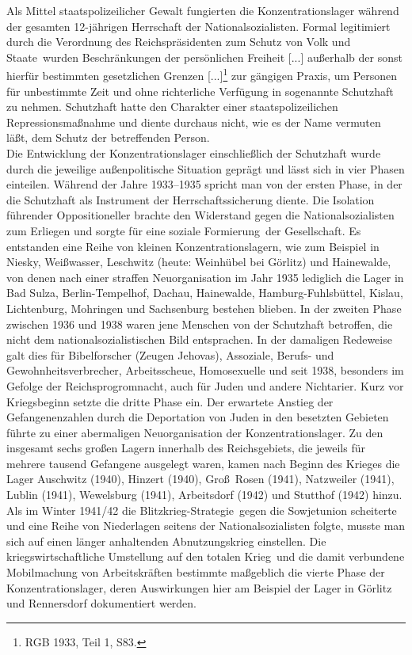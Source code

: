 Als Mittel staatspolizeilicher Gewalt fungierten die Konzentrationslager während der gesamten 12-jährigen Herrschaft der Nationalsozialisten. Formal legitimiert durch die \glqq Verordnung des Reichspräsidenten zum Schutz von Volk und Staate\grqq~wurden \glqq Beschränkungen der persönlichen Freiheit [...] außerhalb der sonst hierfür bestimmten gesetzlichen Grenzen [...]\grqq\footnote{RGB 1933, Teil 1, S83.} zur gängigen Praxis, um Personen für unbestimmte Zeit und ohne richterliche Verfügung in sogenannte Schutzhaft zu nehmen. Schutzhaft hatte den Charakter einer staatspolizeilichen Repressionsmaßnahme und diente durchaus nicht, wie es der Name vermuten läßt, dem Schutz der betreffenden Person.
\\
Die Entwicklung der Konzentrationslager einschließlich der Schutzhaft wurde durch die jeweilige außenpolitische Situation geprägt und lässt sich in vier Phasen einteilen. Während der Jahre 1933--1935 spricht man von der ersten Phase, in der die Schutzhaft als Instrument der Herrschaftssicherung diente. Die Isolation führender Oppositioneller brachte den Widerstand gegen die Nationalsozialisten zum Erliegen und sorgte für eine \glqq soziale Formierung\grqq~der Gesellschaft. Es entstanden eine Reihe von kleinen Konzentrationslagern, wie zum Beispiel in Niesky, Weißwasser, Leschwitz (heute: Weinhübel bei Görlitz) und Hainewalde, von denen nach einer straffen Neuorganisation im Jahr 1935 lediglich die Lager in Bad Sulza, Berlin-Tempelhof, Dachau, Hainewalde, Hamburg-Fuhlsbüttel, Kislau, Lichtenburg, Mohringen und Sachsenburg bestehen blieben.
In der zweiten Phase zwischen 1936 und 1938 waren jene Menschen von der Schutzhaft betroffen, die nicht dem nationalsozialistischen Bild entsprachen. In der damaligen Redeweise galt dies für Bibelforscher (Zeugen Jehovas), Assoziale, Berufs- und Gewohnheitsverbrecher, Arbeitsscheue, Homosexuelle und seit 1938, besonders im Gefolge der Reichsprogromnacht, auch für Juden und andere \glqq Nichtarier\grqq.
Kurz vor Kriegsbeginn setzte die dritte Phase ein. Der erwartete Anstieg der Gefangenenzahlen durch die Deportation von Juden in den besetzten Gebieten führte zu einer abermaligen Neuorganisation der Konzentrationslager. Zu den insgesamt sechs großen Lagern innerhalb des Reichsgebiets, die jeweils für mehrere tausend Gefangene ausgelegt waren, kamen nach Beginn des Krieges die Lager Auschwitz (1940), Hinzert (1940), Groß~Rosen (1941), Natzweiler (1941), Lublin (1941), Wewelsburg (1941), Arbeitsdorf (1942) und Stutthof (1942) hinzu. 
\\
Als im Winter 1941/42 die \glqq Blitzkrieg-Strategie\grqq~gegen die Sowjetunion scheiterte und eine Reihe von Niederlagen seitens der Nationalsozialisten folgte, musste man sich auf einen länger anhaltenden Abnutzungskrieg einstellen. Die kriegswirtschaftliche Umstellung auf den \glqq totalen Krieg\grqq~und die damit verbundene Mobilmachung von Arbeitskräften bestimmte maßgeblich die vierte Phase der Konzentrationslager, deren Auswirkungen hier am Beispiel der Lager in Görlitz und Rennersdorf dokumentiert werden. 
